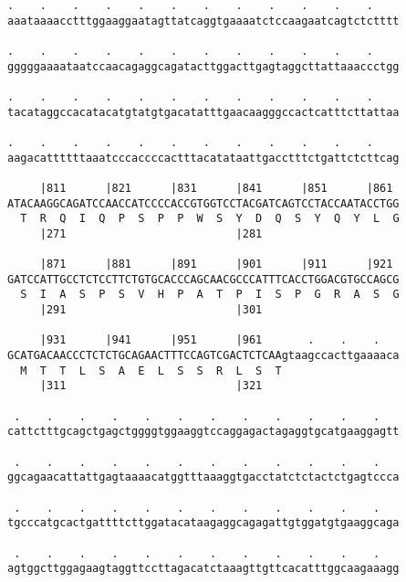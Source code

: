 \documentclass{article}
\begin{document}
\begin{Verbatim}
.    .    .    .    .    .    .    .    .    .    .    .    
aaataaaacctttggaaggaatagttatcaggtgaaaatctccaagaatcagtctctttt
                                                            
.    .    .    .    .    .    .    .    .    .    .    .    
gggggaaaataatccaacagaggcagatacttggacttgagtaggcttattaaaccctgg
                                                            
.    .    .    .    .    .    .    .    .    .    .    .    
tacataggccacatacatgtatgtgacatatttgaacaagggccactcatttcttattaa
                                                            
.    .    .    .    .    .    .    .    .    .    .    .    
aagacattttttaaatcccaccccactttacatataattgacctttctgattctcttcag
                                                            
     |811      |821      |831      |841      |851      |861 
ATACAAGGCAGATCCAACCATCCCCACCGTGGTCCTACGATCAGTCCTACCAATACCTGG
  T  R  Q  I  Q  P  S  P  P  W  S  Y  D  Q  S  Y  Q  Y  L  G
     |271                          |281                     
  
     |871      |881      |891      |901      |911      |921 
GATCCATTGCCTCTCCTTCTGTGCACCCAGCAACGCCCATTTCACCTGGACGTGCCAGCG
  S  I  A  S  P  S  V  H  P  A  T  P  I  S  P  G  R  A  S  G
     |291                          |301                     
  
     |931      |941      |951      |961       .    .    .   
GCATGACAACCCTCTCTGCAGAACTTTCCAGTCGACTCTCAAgtaagccacttgaaaaca
  M  T  T  L  S  A  E  L  S  S  R  L  S  T                  
     |311                          |321                     
  
 .    .    .    .    .    .    .    .    .    .    .    .   
cattctttgcagctgagctggggtggaaggtccaggagactagaggtgcatgaaggagtt
                                                            
 .    .    .    .    .    .    .    .    .    .    .    .   
ggcagaacattattgagtaaaacatggtttaaaggtgacctatctctactctgagtccca
                                                            
 .    .    .    .    .    .    .    .    .    .    .    .   
tgcccatgcactgattttcttggatacataagaggcagagattgtggatgtgaaggcaga
                                                            
 .    .    .    .    .    .    .    .    .    .    .    .   
agtggcttggagaagtaggttccttagacatctaaagttgttcacatttggcaagaaagg
                                                            

\end{Verbatim}
\end{document}
